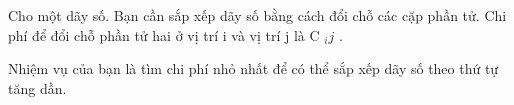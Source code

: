 Cho một dãy số. Bạn cần sắp xếp dãy số bằng cách đổi chỗ các cặp phần tử. Chi phí để đổi chỗ phần tử hai ở vị trí i và vị trí j là C $_ ij $ .

Nhiệm vụ của bạn là tìm chi phí nhỏ nhất để có thể sắp xếp dãy số theo thứ tự tăng dần.

\